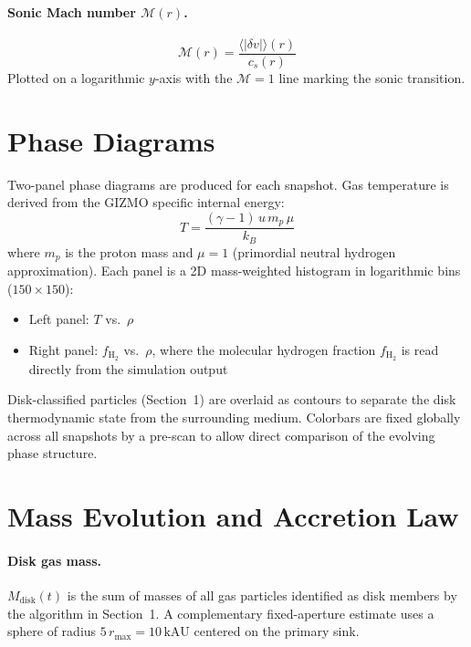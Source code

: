 \documentclass[12pt]{article}
\begin{document}
\paragraph{Sonic Mach number $\mathcal{M}(r)$.}
\begin{equation}
    \mathcal{M}(r) = \frac{\langle|\delta v|\rangle(r)}{c_s(r)}
\end{equation}
Plotted on a logarithmic $y$-axis with the $\mathcal{M} = 1$ line marking the
sonic transition.


\section{Phase Diagrams}

Two-panel phase diagrams are produced for each snapshot. Gas temperature is
derived from the GIZMO specific internal energy:
\begin{equation}
    T = \frac{(\gamma - 1)\,u\,m_p\,\mu}{k_B}
\end{equation}
where $m_p$ is the proton mass and $\mu = 1$ (primordial neutral hydrogen
approximation). Each panel is a 2D mass-weighted histogram in logarithmic bins
($150 \times 150$):
\begin{itemize}
    \item Left panel: $T$ vs.\ $\rho$
    \item Right panel: $f_{\mathrm{H}_2}$ vs.\ $\rho$, where the molecular
          hydrogen fraction $f_{\mathrm{H}_2}$ is read directly from the
          simulation output
\end{itemize}
Disk-classified particles (Section~1) are overlaid as contours to separate the
disk thermodynamic state from the surrounding medium. Colorbars are fixed globally
across all snapshots by a pre-scan to allow direct comparison of the evolving
phase structure.


\section{Mass Evolution and Accretion Law}

\paragraph{Disk gas mass.}
$M_\mathrm{disk}(t)$ is the sum of masses of all gas particles identified as disk
members by the algorithm in Section~1. A complementary fixed-aperture estimate
uses a sphere of radius $5\,r_\mathrm{max} = 10\,\mathrm{kAU}$ centered on the
primary sink.
\end{document}
